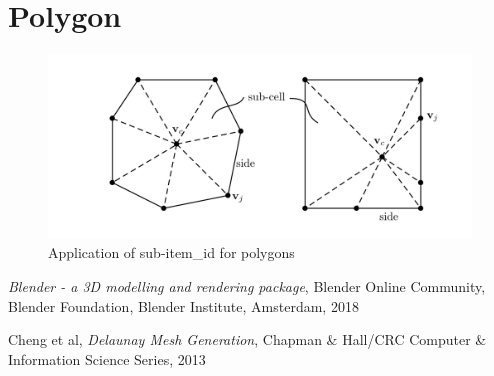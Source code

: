 \documentclass[11pt,letterpaper,titlepage]{article}
\numberwithin{equation}{section}
\begin{document}
\newpage
\section{Polygon}

\begin{figure}[h]
	\centering
	\includegraphics[width=0.7\linewidth]{Images/Polygon}
	\caption{Application of sub-item_id for polygons}
	\label{fig:polygon}
\end{figure}






\newpage
\begin{appendices}
\vspace{1cm}

\end{appendices}

\newpage
{}
\begin{thebibliography}{1}
    
     {\em Blender - a 3D modelling and rendering package}, Blender Online Community, Blender Foundation, Blender Institute, Amsterdam, 2018
    
     Cheng et al, {\em Delaunay Mesh Generation}, Chapman \& Hall/CRC Computer \& Information Science Series, 2013
    
    
\end{thebibliography}
\end{document}
